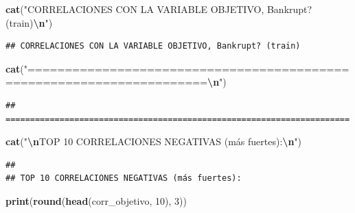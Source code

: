 \documentclass[
]{book}
\newenvironment{Shaded}{\begin{snugshade}}{\end{snugshade}}
\newcommand{\DecValTok}[1]{\textcolor[rgb]{0.00,0.00,0.81}{#1}}
\newcommand{\FunctionTok}[1]{\textcolor[rgb]{0.13,0.29,0.53}{\textbf{#1}}}
\newcommand{\NormalTok}[1]{#1}
\newcommand{\SpecialCharTok}[1]{\textcolor[rgb]{0.81,0.36,0.00}{\textbf{#1}}}
\newcommand{\StringTok}[1]{\textcolor[rgb]{0.31,0.60,0.02}{#1}}
\begin{document}
\begin{Shaded}
\begin{Highlighting}[]
\FunctionTok{cat}\NormalTok{(}\StringTok{"CORRELACIONES CON LA VARIABLE OBJETIVO, Bankrupt? (train)}\SpecialCharTok{\textbackslash{}n}\StringTok{"}\NormalTok{)}
\end{Highlighting}
\end{Shaded}

\begin{verbatim}
## CORRELACIONES CON LA VARIABLE OBJETIVO, Bankrupt? (train)
\end{verbatim}

\begin{Shaded}
\begin{Highlighting}[]
\FunctionTok{cat}\NormalTok{(}\StringTok{"======================================================================}\SpecialCharTok{\textbackslash{}n}\StringTok{"}\NormalTok{)}
\end{Highlighting}
\end{Shaded}

\begin{verbatim}
## ======================================================================
\end{verbatim}

\begin{Shaded}
\begin{Highlighting}[]
\FunctionTok{cat}\NormalTok{(}\StringTok{"}\SpecialCharTok{\textbackslash{}n}\StringTok{TOP 10 CORRELACIONES NEGATIVAS (más fuertes):}\SpecialCharTok{\textbackslash{}n}\StringTok{"}\NormalTok{)}
\end{Highlighting}
\end{Shaded}

\begin{verbatim}
## 
## TOP 10 CORRELACIONES NEGATIVAS (más fuertes):
\end{verbatim}

\begin{Shaded}
\begin{Highlighting}[]
\FunctionTok{print}\NormalTok{(}\FunctionTok{round}\NormalTok{(}\FunctionTok{head}\NormalTok{(corr\_objetivo, }\DecValTok{10}\NormalTok{), }\DecValTok{3}\NormalTok{))}
\end{Highlighting}
\end{Shaded}
\end{document}
